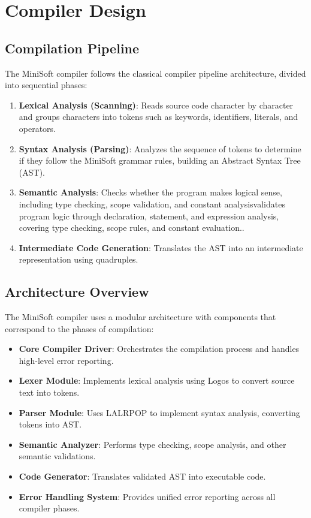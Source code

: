\documentclass[12pt,a4paper]{article}
\begin{document}
\section{Compiler Design}
\subsection{Compilation Pipeline}
The MiniSoft compiler follows the classical compiler pipeline architecture, divided into sequential phases:

\begin{enumerate}
	\item \textbf{Lexical Analysis (Scanning)}: Reads source code character by character and groups characters into tokens such as keywords, identifiers, literals, and operators.

	\item \textbf{Syntax Analysis (Parsing)}: Analyzes the sequence of tokens to determine if they follow the MiniSoft grammar rules, building an Abstract Syntax Tree (AST).

	\item \textbf{Semantic Analysis}: Checks whether the program makes logical sense, including type checking, scope validation, and constant analysisvalidates program logic through declaration, statement, and expression analysis, covering type checking, scope rules, and constant evaluation..

	\item \textbf{Intermediate Code Generation}: Translates the AST into an intermediate representation using quadruples.
\end{enumerate}

\subsection{Architecture Overview}
The MiniSoft compiler uses a modular architecture with components that correspond to the phases of compilation:

\begin{itemize}
	\item \textbf{Core Compiler Driver}: Orchestrates the compilation process and handles high-level error reporting.

	\item \textbf{Lexer Module}: Implements lexical analysis using Logos to convert source text into tokens.

	\item \textbf{Parser Module}: Uses LALRPOP to implement syntax analysis, converting tokens into AST.

	\item \textbf{Semantic Analyzer}: Performs type checking, scope analysis, and other semantic validations.

	\item \textbf{Code Generator}: Translates validated AST into executable code.

	\item \textbf{Error Handling System}: Provides unified error reporting across all compiler phases.
\end{itemize}
\end{document}
